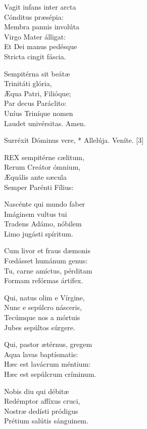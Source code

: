 Vagit infans inter arcta\\
Cónditus præsépia:\\
Membra pannis involúta\\
Virgo Mater álligat:\\
Et Dei manus pedésque\\
Stricta cingit fáscia.

Sempitérna sit beátæ\\
Trinitáti glória,\\
Æqua Patri, Filióque;\\
Par decus Paráclito:\\
Uníus Triníque nomen\\
Laudet univérsitas. Amen.



 Surréxit Dóminus vere, * Allelúja.  Veníte. [3]


\lettrine[lines=2]{R}{EX} sempitérne cælitum,\\
Rerum Creátor ómnium,\\
Æquális ante sæcula\\
Semper Parénti Fílius:

Nascénte qui mundo faber\\
Imáginem vultus tui\\
Tradens Adámo, nóbilem\\
Limo jugásti spíritum.

Cum livor et fraus dæmonis\\
Fœdásset humánum genus:\\
Tu, carne amíctus, pérditam\\
Formam refórmas ártifex.

Qui, natus olim e Vírgine,\\
Nunc e sepúlcro násceris,\\
Tecúmque nos a mórtuis\\
Jubes sepúltos súrgere.

Qui, pastor ætérnus, gregem\\
Aqua lavas baptísmatis:\\
Hæc est lavácrum méntium:\\
Hæc est sepúlcrum críminum.

Nobis diu qui débitæ\\
Redémptor affíxus cruci,\\
Nostræ dedísti pródigus\\
Prétium salútis sánguinem.

